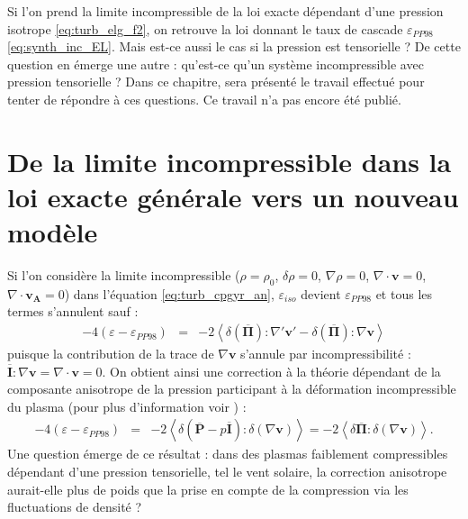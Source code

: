  Si l'on prend la limite incompressible de la loi exacte dépendant d'une pression isotrope \eqref{eq:turb_elg_f2}, on retrouve la loi  donnant le taux de cascade $\varepsilon_{PP98}$ \eqref{eq:synth_inc_EL}. Mais est-ce aussi le cas si la pression est tensorielle ? De cette question en émerge une autre : qu'est-ce qu'un système incompressible avec pression tensorielle ? Dans ce chapitre, sera présenté le travail effectué pour tenter de répondre à ces questions. Ce travail n'a pas encore été publié. 

\section{De la limite incompressible dans la loi exacte générale vers un nouveau modèle }
\label{sec-221}

Si l'on considère la limite incompressible ($\rho = \rho_0$, $\delta \rho = 0$, $\nabla \rho=0$, $\nabla \cdot \boldsymbol{v}=0$, $\nabla \cdot \boldsymbol{v_A}=0$) dans l'équation \eqref{eq:turb_cpgyr_an}, $\varepsilon_{iso}$ devient $\varepsilon_{PP98}$ et tous les termes s'annulent sauf : 
\begin{eqnarray}
\label{eq:turb_cpinc_an} 
- 4(\varepsilon - \varepsilon_{PP98}) &=& -2 \left< \delta (\overline{\boldsymbol{\Pi}}):\nabla' \boldsymbol{v'} -   \delta (\overline{\boldsymbol{\Pi}} ) :\nabla  \boldsymbol{v}\right> 
\end{eqnarray}
puisque la contribution de la trace de $\nabla \boldsymbol{v}$ s'annule par incompressibilité : $\overline{\boldsymbol{I}} :\nabla \boldsymbol{v} = \nabla \cdot \boldsymbol{v}=0$. On obtient ainsi une correction à la théorie  dépendant de la composante anisotrope de la pression participant à la déformation incompressible du plasma (pour plus d'information voir \cite{cassak_pressure-strain_2022}) : 
\begin{equation}
\label{eq:turb_cpinc_gen} \boxed{
\begin{array}{lcl}
- 4(\varepsilon - \varepsilon_{PP98}) &=& -2 \left< \delta (\overline{\boldsymbol{P}} - p \overline{\boldsymbol{I}}):\delta (\nabla \boldsymbol{v}) \right> = -2 \left< \delta \overline{\boldsymbol{\Pi}} :\delta (\nabla \boldsymbol{v}) \right>.
\end{array}}
\end{equation}
Une question émerge de ce résultat : dans des plasmas faiblement compressibles dépendant d'une pression tensorielle, tel le vent solaire, la correction anisotrope aurait-elle plus de poids que la prise en compte de la compression via les fluctuations de densité ?

